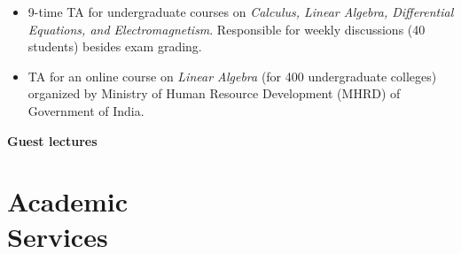 \documentclass[margin,centered]{res}
\newcommand\quelle[1]{{%
      \unskip\nobreak\hfil\penalty50
      \hskip2em\hbox{}\nobreak\hfil\emph{#1}%
      \parfillskip=0pt \finalhyphendemerits=0 \par}}
\begin{document}
\begin{resume}
\begin{itemize}
\item 9-time TA for undergraduate courses on \emph{Calculus, Linear Algebra, Differential Equations, and Electromagnetism}. Responsible for weekly discussions (40 students) besides exam grading.
\item TA for an online course on \emph{Linear Algebra} (for
400 undergraduate colleges) organized by Ministry of Human Resource Development (MHRD) of Government of India. 
\end{itemize}
\vsep
\textbf{Guest lectures}



\section{\sc Academic \\ Services} 


\end{resume}
\end{document}
